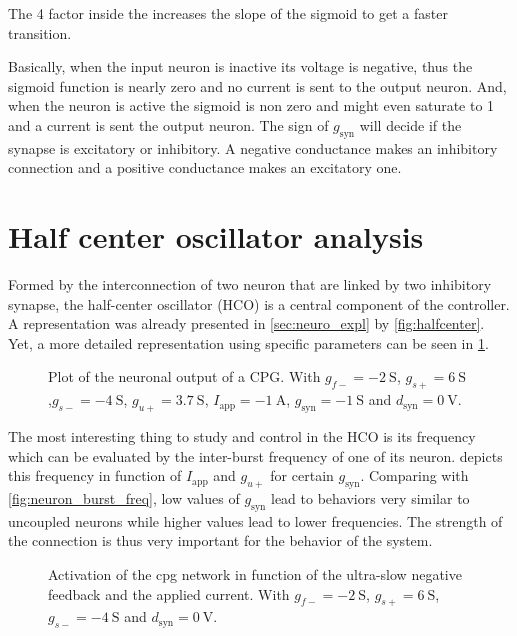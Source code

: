 The 4 factor inside the increases the slope of the sigmoid to get a faster transition.

Basically, when the input neuron is inactive its voltage is negative, thus the sigmoid function is nearly zero and no current is sent to the output neuron. And, when the neuron is active the sigmoid is non zero and might even saturate to 1 and a current is sent the output neuron. The sign of $g_\text{syn}$ will  decide if the synapse is excitatory or inhibitory. A negative conductance makes an inhibitory connection and a positive conductance makes an excitatory one.

\section{Half center oscillator  analysis}

Formed by the interconnection of two neuron that are linked by two inhibitory synapse, the half-center oscillator (HCO) is a central component of the controller. A representation was already presented in \cref{sec:neuro_expl} by \cref{fig:halfcenter}. Yet, a more detailed representation using specific parameters can be seen in \cref{fig:cpg_time}.

\begin{figure}[!htb] %
    \centering
    \caption{Plot of the neuronal output of a CPG. With $g_{f-}=\qty{-2}{\siemens}$, $g_{s+}=\qty{6}{\siemens}$ ,$g_{s-}=\qty{-4}{\siemens}$, $g_{u+} = \qty{3.7}{\siemens}$, $I_\text{app} = \qty{-1}{\ampere}$, $g_\text{syn} = \qty{-1}{\siemens}$ and $d_\text{syn} = \qty{0}{\volt}$.}
    \label{fig:cpg_time}
\end{figure}

The most interesting thing to study and control in the HCO is its frequency which can be evaluated by the inter-burst frequency of one of its neuron.  depicts this frequency in function of $I_\text{app}$ and $g_{u+}$ for certain $g_\text{syn}$. Comparing with \cref{fig:neuron_burst_freq}, low values of $g_\text{syn}$ lead to behaviors very similar to uncoupled neurons while higher values lead to lower frequencies. The strength of the connection is thus very important for the behavior of the system.

\begin{figure}[!htb]
    \centering
    \caption{Activation of the cpg network in function of the ultra-slow negative feedback and the applied current. With $g_{f-}=\qty{-2}{\siemens}$, $g_{s+}=\qty{6}{\siemens}$, $g_{s-}=\qty{-4}{\siemens}$ and $d_\text{syn} = \qty{0}{\volt}$.}
    \label{fig:cpg_act}
\end{figure}

